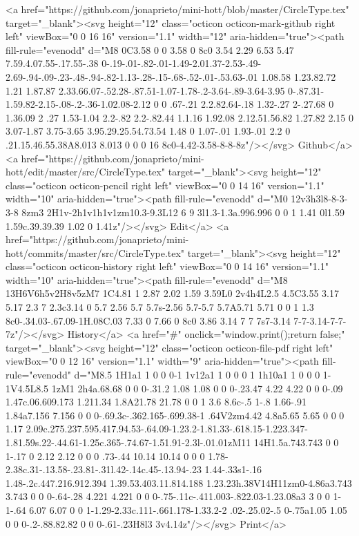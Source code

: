       <a href="https://github.com/jonaprieto/mini-hott/blob/master/CircleType.tex" target="_blank"><svg height="12" class="octicon octicon-mark-github right left" viewBox="0 0 16 16" version="1.1" width="12" aria-hidden="true"><path fill-rule="evenodd" d="M8 0C3.58 0 0 3.58 0 8c0 3.54 2.29 6.53 5.47 7.59.4.07.55-.17.55-.38 0-.19-.01-.82-.01-1.49-2.01.37-2.53-.49-2.69-.94-.09-.23-.48-.94-.82-1.13-.28-.15-.68-.52-.01-.53.63-.01 1.08.58 1.23.82.72 1.21 1.87.87 2.33.66.07-.52.28-.87.51-1.07-1.78-.2-3.64-.89-3.64-3.95 0-.87.31-1.59.82-2.15-.08-.2-.36-1.02.08-2.12 0 0 .67-.21 2.2.82.64-.18 1.32-.27 2-.27.68 0 1.36.09 2 .27 1.53-1.04 2.2-.82 2.2-.82.44 1.1.16 1.92.08 2.12.51.56.82 1.27.82 2.15 0 3.07-1.87 3.75-3.65 3.95.29.25.54.73.54 1.48 0 1.07-.01 1.93-.01 2.2 0 .21.15.46.55.38A8.013 8.013 0 0 0 16 8c0-4.42-3.58-8-8-8z"/></svg> Github</a>
      <a href="https://github.com/jonaprieto/mini-hott/edit/master/src/CircleType.tex" target="_blank"><svg height="12" class="octicon octicon-pencil right left" viewBox="0 0 14 16" version="1.1" width="10" aria-hidden="true"><path fill-rule="evenodd" d="M0 12v3h3l8-8-3-3-8 8zm3 2H1v-2h1v1h1v1zm10.3-9.3L12 6 9 3l1.3-1.3a.996.996 0 0 1 1.41 0l1.59 1.59c.39.39.39 1.02 0 1.41z"/></svg> Edit</a>
      <a href="https://github.com/jonaprieto/mini-hott/commits/master/src/CircleType.tex" target="_blank"><svg height="12" class="octicon octicon-history right left" viewBox="0 0 14 16" version="1.1" width="10" aria-hidden="true"><path fill-rule="evenodd" d="M8 13H6V6h5v2H8v5zM7 1C4.81 1 2.87 2.02 1.59 3.59L0 2v4h4L2.5 4.5C3.55 3.17 5.17 2.3 7 2.3c3.14 0 5.7 2.56 5.7 5.7s-2.56 5.7-5.7 5.7A5.71 5.71 0 0 1 1.3 8c0-.34.03-.67.09-1H.08C.03 7.33 0 7.66 0 8c0 3.86 3.14 7 7 7s7-3.14 7-7-3.14-7-7-7z"/></svg> History</a>
      <a  href="#" onclick="window.print();return false;" target="_blank"><svg height="12" class="octicon octicon-file-pdf right left" viewBox="0 0 12 16" version="1.1" width="9" aria-hidden="true"><path fill-rule="evenodd" d="M8.5 1H1a1 1 0 0 0-1 1v12a1 1 0 0 0 1 1h10a1 1 0 0 0 1-1V4.5L8.5 1zM1 2h4a.68.68 0 0 0-.31.2 1.08 1.08 0 0 0-.23.47 4.22 4.22 0 0 0-.09 1.47c.06.609.173 1.211.34 1.8A21.78 21.78 0 0 1 3.6 8.6c-.5 1-.8 1.66-.91 1.84a7.156 7.156 0 0 0-.69.3c-.362.165-.699.38-1 .64V2zm4.42 4.8a5.65 5.65 0 0 0 1.17 2.09c.275.237.595.417.94.53-.64.09-1.23.2-1.81.33-.618.15-1.223.347-1.81.59s.22-.44.61-1.25c.365-.74.67-1.51.91-2.3l-.01.01zM11 14H1.5a.743.743 0 0 1-.17 0 2.12 2.12 0 0 0 .73-.44 10.14 10.14 0 0 0 1.78-2.38c.31-.13.58-.23.81-.31l.42-.14c.45-.13.94-.23 1.44-.33s1-.16 1.48-.2c.447.216.912.394 1.39.53.403.11.814.188 1.23.23h.38V14H11zm0-4.86a3.743 3.743 0 0 0-.64-.28 4.221 4.221 0 0 0-.75-.11c-.411.003-.822.03-1.23.08a3 3 0 0 1-1-.64 6.07 6.07 0 0 1-1.29-2.33c.111-.661.178-1.33.2-2 .02-.25.02-.5 0-.75a1.05 1.05 0 0 0-.2-.88.82.82 0 0 0-.61-.23H8l3 3v4.14z"/></svg> Print</a>
